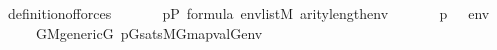 \begin{isabelle}
\isamarkupfalse%
\ definition{\isacharunderscore}of{\isacharunderscore}forces{\isacharcolon}\isanewline
\ \ \isanewline
\ \ \ \ {\isachardoublequoteopen}p{\isasymin}P{\isachardoublequoteclose}\ {\isachardoublequoteopen}{\isasymphi}{\isasymin}formula{\isachardoublequoteclose}\ {\isachardoublequoteopen}env{\isasymin}list{\isacharparenleft}M{\isacharparenright}{\isachardoublequoteclose}\ {\isachardoublequoteopen}arity{\isacharparenleft}{\isasymphi}{\isacharparenright}{\isasymle}length{\isacharparenleft}env{\isacharparenright}{\isachardoublequoteclose}\isanewline
\ \ \isanewline
\ \ \ \ {\isachardoublequoteopen}{\isacharparenleft}p\ {\isasymtturnstile}\ {\isasymphi}\ env{\isacharparenright}\ {\isasymlongleftrightarrow}\isanewline
\ \ \ \ \ {\isacharparenleft}{\isasymforall}G{\isachardot}{\isacharparenleft}M{\isacharunderscore}generic{\isacharparenleft}G{\isacharparenright}{\isasymand}\ p{\isasymin}G{\isacharparenright}{\isasymlongrightarrow}sats{\isacharparenleft}M{\isacharbrackleft}G{\isacharbrackright}{\isacharcomma}{\isasymphi}{\isacharcomma}map{\isacharparenleft}val{\isacharparenleft}G{\isacharparenright}{\isacharcomma}env{\isacharparenright}{\isacharparenright}{\isacharparenright}{\isachardoublequoteclose}
\end{isabelle}

